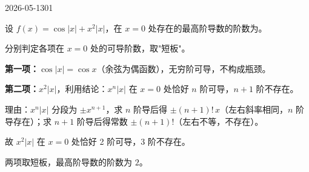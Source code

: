\begin{mistake}{2026-05-13}{01}

\begin{problemcontent}
设 \(f(x) = \cos|x| + x^2|x|\)，在 \(x = 0\) 处存在的最高阶导数的阶数为\underline{\hspace{2em}}。
\end{problemcontent}

\begin{solutioncontent}
分别判定各项在 \(x=0\) 处的可导阶数，取"短板"。

\textbf{第一项：}\(\cos|x| = \cos x\)（余弦为偶函数），无穷阶可导，不构成瓶颈。

\textbf{第二项：}\(x^2|x|\)，利用结论：\(x^n|x|\) 在 \(x=0\) 处恰好 \(n\) 阶可导，\(n+1\) 阶不存在。

理由：\(x^n|x|\) 分段为 \(\pm x^{n+1}\)，求 \(n\) 阶导后得 \(\pm(n+1)!\,x\)（左右斜率相同，\(n\) 阶导存在）；求 \(n+1\) 阶导后得常数 \(\pm(n+1)!\)（左右不等，不存在）。

故 \(x^2|x|\) 在 \(x=0\) 处恰好 2 阶可导，3 阶不存在。

两项取短板，最高阶导数的阶数为 \(\boxed{2}\)。
\end{solutioncontent}


\end{mistake}
